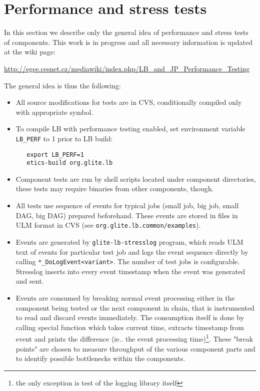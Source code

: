 \section{Performance and stress tests}
\label{s:perftests}

In this section we describe only the general idea of performance and stress tests of \LB components.
This work is in progress and all necessary information is updated at the wiki page:

\begin{center}
\url{http://egee.cesnet.cz/mediawiki/index.php/LB_and_JP_Performance_Testing}
\end{center}

The general idea is thus the following:

\begin{itemize}

\item All source modifications for tests are in CVS, conditionally compiled only
with appropriate symbol.

\item To compile LB with performance testing enabled, set environment variable
\verb'LB_PERF' to 1 prior to LB build:
\begin{verbatim}
   export LB_PERF=1
   etics-build org.glite.lb
\end{verbatim}

\item Component tests are run by shell scripts located under component
directories, these tests may require binaries from other components, though.

\item All tests use sequence of events for typical jobs (small job, big job,
small DAG, big DAG) prepared beforehand. These events are stored in files in
ULM format in CVS (see \texttt{org.glite.lb.common/examples}).

\item Events are generated by \verb'glite-lb-stresslog' program, which reads
ULM text of events for particular test job and logs the event sequence directly
by calling \verb'*_DoLogEvent<variant>'. The number of test jobs is
configurable. Stresslog inserts into every event timestamp when the event was
generated and sent.

\item Events are consumed by breaking normal event processing either in the
component being tested or the next component in chain, that is instrumented to
read and discard events immediately. The consumption itself is done by calling
special function which takes current time, extracts timestamp from event and
prints the difference (ie.. the event processing time)\footnote{the only
exception is test of the logging library itself}. These "break points" are
chosen to measure throughput of the various component parts and to identify
possible bottlenecks within the components.


\end{itemize}
